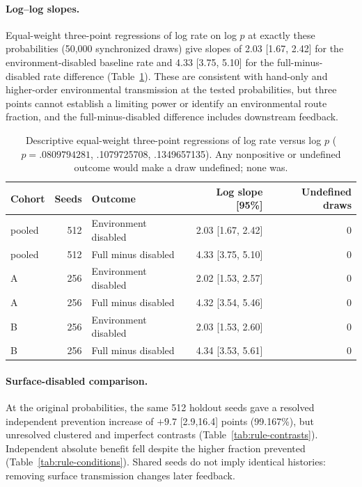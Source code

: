 \documentclass[11pt]{article}
\begin{document}
\paragraph{Log--log slopes.} Equal-weight three-point regressions of log rate on
log $p$ at exactly these probabilities (50,000 synchronized draws) give slopes of
2.03 [1.67, 2.42] for the environment-disabled baseline rate and 4.33 [3.75,
5.10] for the full-minus-disabled rate difference (Table~\ref{tab:env-slopes}).
These are consistent with hand-only and higher-order environmental transmission
at the tested probabilities, but three points cannot establish a limiting power
or identify an environmental route fraction, and the full-minus-disabled
difference includes downstream feedback.

\begin{table}[htbp]\centering\footnotesize
\caption{Descriptive equal-weight three-point regressions of log rate versus log $p$ ($p=.0809794281$, .1079725708, .1349657135). Any nonpositive or undefined outcome would make a draw undefined; none was.}\label{tab:env-slopes}
\begin{tabular}{lrlrr}\toprule
Cohort & Seeds & Outcome & Log slope [95\%] & Undefined draws\\\midrule
pooled & 512 & Environment disabled & 2.03 [1.67, 2.42] & 0\\
pooled & 512 & Full minus disabled & 4.33 [3.75, 5.10] & 0\\
A & 256 & Environment disabled & 2.02 [1.53, 2.57] & 0\\
A & 256 & Full minus disabled & 4.32 [3.54, 5.46] & 0\\
B & 256 & Environment disabled & 2.03 [1.53, 2.60] & 0\\
B & 256 & Full minus disabled & 4.34 [3.53, 5.61] & 0\\
\bottomrule\end{tabular}
\end{table}

\paragraph{Surface-disabled comparison.}
At the original probabilities, the same 512 holdout seeds gave a resolved
independent prevention increase of $+9.7$ [2.9,16.4] points (99.167\%), but
unresolved clustered and imperfect contrasts
(Table~\ref{tab:rule-contrasts}). Independent absolute benefit fell despite
the higher fraction prevented (Table~\ref{tab:rule-conditions}). Shared seeds
do not imply identical histories: removing surface transmission changes
later feedback.
\end{document}
